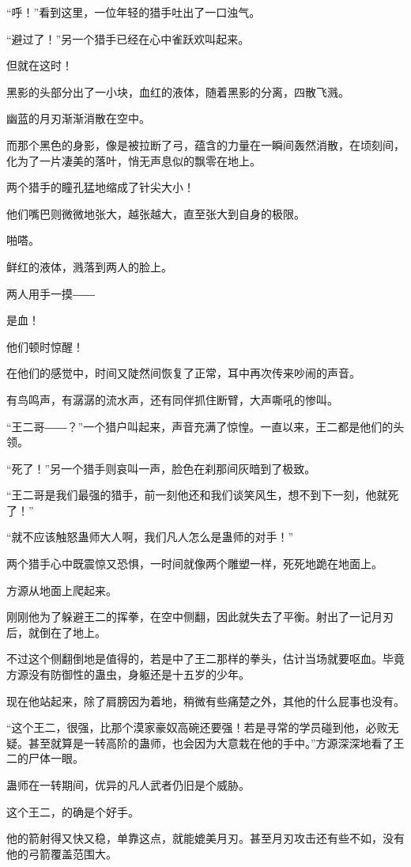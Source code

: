 \begin{this_body}
“呼！”看到这里，一位年轻的猎手吐出了一口浊气。

“避过了！”另一个猎手已经在心中雀跃欢叫起来。

但就在这时！

黑影的头部分出了一小块，血红的液体，随着黑影的分离，四散飞溅。

幽蓝的月刃渐渐消散在空中。

而那个黑色的身影，像是被拉断了弓，蕴含的力量在一瞬间轰然消散，在顷刻间，化为了一片凄美的落叶，悄无声息似的飘零在地上。

两个猎手的瞳孔猛地缩成了针尖大小！

他们嘴巴则微微地张大，越张越大，直至张大到自身的极限。

啪嗒。

鲜红的液体，溅落到两人的脸上。

两人用手一摸――

是血！

他们顿时惊醒！

在他们的感觉中，时间又陡然间恢复了正常，耳中再次传来吵闹的声音。

有鸟鸣声，有潺潺的流水声，还有同伴抓住断臂，大声嘶吼的惨叫。

“王二哥――？”一个猎户叫起来，声音充满了惊惶。一直以来，王二都是他们的头领。

“死了！”另一个猎手则哀叫一声，脸色在刹那间灰暗到了极致。

“王二哥是我们最强的猎手，前一刻他还和我们谈笑风生，想不到下一刻，他就死了！”

“就不应该触怒蛊师大人啊，我们凡人怎么是蛊师的对手！”

两个猎手心中既震惊又恐惧，一时间就像两个雕塑一样，死死地跪在地面上。

方源从地面上爬起来。

刚刚他为了躲避王二的挥拳，在空中侧翻，因此就失去了平衡。射出了一记月刃后，就倒在了地上。

不过这个侧翻倒地是值得的，若是中了王二那样的拳头，估计当场就要呕血。毕竟方源没有防御性的蛊虫，身躯还是十五岁的少年。

现在他站起来，除了肩膀因为着地，稍微有些痛楚之外，其他的什么屁事也没有。

“这个王二，很强，比那个漠家豪奴高碗还要强！若是寻常的学员碰到他，必败无疑。甚至就算是一转高阶的蛊师，也会因为大意栽在他的手中。”方源深深地看了王二的尸体一眼。

蛊师在一转期间，优异的凡人武者仍旧是个威胁。

这个王二，的确是个好手。

他的箭射得又快又稳，单靠这点，就能媲美月刃。甚至月刃攻击还有些不如，没有他的弓箭覆盖范围大。


\end{this_body}

